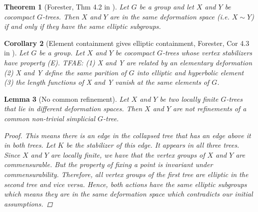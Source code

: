 \documentclass{article}
\theoremstyle{mystyle}
\newtheorem{thm}{Theorem}[section]
\newtheorem{lem}[thm]{Lemma}
\newtheorem{cor}[thm]{Corollary}
\theoremstyle{remark}
\begin{document}
\begin{thm}[Forester, Thm 4.2 in \cite{foresterdeformationrigidity}]
\label{thm:forester}
Let $G$ be a group and let $X$ and $Y$ be cocompact $G$-trees. Then $X$ and $Y$ are in the same deformation space (i.e. $X\sim Y$) if and only if they have the same elliptic subgroups.
\end{thm}

\begin{cor}
[Element containment gives elliptic containment, Forester, Cor 4.3 in \cite{foresterdeformationrigidity}]
\label{cor:foresterelementcontainment}
Let $G$ be a group. Let $X$ and $Y$ be cocompact $G$-trees whose vertex stabilizers have property (E). TFAE: (1) X and Y are related by an elementary deformation (2) X and Y define the same parition of $G$ into elliptic and hyperbolic element (3) the length functions of X and Y vanish at the same elements of $G$.
\end{cor}

\begin{lem}
    [No common refinement]
    \label{lem:nocommonrefinement} 
    Let \(X\) and \(Y\) be two locally finite \(G\)-trees that lie in different deformation spaces. Then $X$ and $Y$ are not refinements of a common non-trivial simplicial $G$-tree.
    \begin{proof}
        This means there is an edge in the collapsed tree that has an edge above it in both trees. Let \(K\) be the stabilizer of this edge. It appears in all three trees. Since $X$ and $Y$ are locally finite, we have that the vertex groups of $X$ and $Y$ are commensurable. But the property of fixing a point is invariant under commensurability. Therefore, all vertex groups of the first tree are elliptic in the second tree and vice versa. Hence, both actions have the same elliptic subgroups which means they are in the same deformation space which contradicts our initial assumptions.
    \end{proof}
\end{lem}
\end{document}
